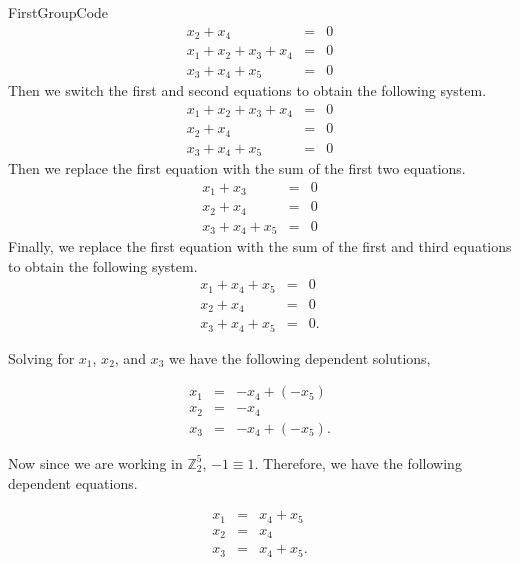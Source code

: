 \begin{example}{FirstGroupCode}
\begin{eqnarray*}
 x_2 + x_4   & = & 0 \\
x_1 + x_2 + x_3 + x_4  & = & 0 \\
 x_3 + x_4 + x_5 & = & 0
\end{eqnarray*}
Then we switch the first and second equations to obtain the following system.
 \begin{eqnarray*}
 x_1 + x_2 + x_3 + x_4  & = & 0\\
  x_2 + x_4   & = & 0\\
  x_3 + x_4 + x_5 & = & 0
\end{eqnarray*}
Then we replace the first equation with the sum of the first two equations.
  \begin{eqnarray*}
  x_1 + x_3  & = & 0\\
 x_2 + x_4  & = & 0\\
   x_3 + x_4 + x_5 & = & 0
\end{eqnarray*}
Finally, we replace the first equation with the sum of the first and third equations to obtain the following system.
\begin{eqnarray*}
  x_1 + x_4  + x_5 & = & 0 \\
 x_2 + x_4  & = & 0 \\
 x_3 + x_4 + x_5 & = & 0.
\end{eqnarray*}

Solving for $x_1$, $x_2$, and $x_3$ we have the following dependent solutions,

\begin{eqnarray*}
  x_1 &=& - x_4  + (- x_5)  \\
 x_2 &=& - x_4   \\
 x_3 &=& - x_4 + (-x_5).
\end{eqnarray*}

Now since we are working in $\mathbb{Z}_2^5$, $-1\equiv1$. Therefore, we have the following dependent equations.

\begin{eqnarray*}
  x_1 &=& x_4  + x_5 \\
 x_2 &=&  x_4   \\
 x_3 &=&  x_4 + x_5.
\end{eqnarray*}


\end{example}
